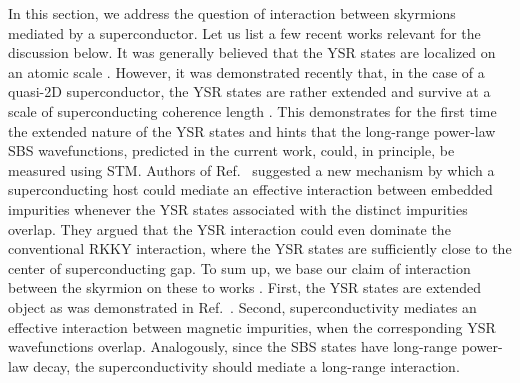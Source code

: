 \documentclass[twocolumn,showpacs,floatfix,longbibliography]{revtex4-1}
\begin{document}
\begin{widetext}
In this section, we address the question of interaction between skyrmions mediated by a superconductor. Let us list a few recent works relevant for the discussion below. It was generally believed that the YSR states are localized on an atomic scale \cite{Balatsky2006}. However, it was demonstrated recently that, in the case of a quasi-2D superconductor, the YSR states are rather extended and survive at a scale of superconducting coherence length \cite{Menard2015}. This demonstrates for the first time the extended nature of the YSR states and hints that the long-range power-law SBS wavefunctions, predicted in the current work, could, in principle, be measured using STM. Authors of Ref.~\cite{Yao2014} suggested a new mechanism by which a superconducting host could mediate an effective interaction between embedded impurities whenever the YSR states associated with the distinct impurities overlap. They argued that the YSR interaction could even dominate the conventional RKKY interaction, where the YSR states are sufficiently close to the center of superconducting gap. To sum up, we base our claim of interaction between the skyrmion on these to works \cite{Menard2015,Yao2014}. First, the YSR states are extended object as was demonstrated in Ref.~\cite{Menard2015}. Second, superconductivity mediates an effective interaction between magnetic impurities, when the corresponding YSR wavefunctions overlap. Analogously, since the SBS states have long-range power-law decay, the superconductivity should mediate a long-range interaction.



\end{widetext}
\end{document}
